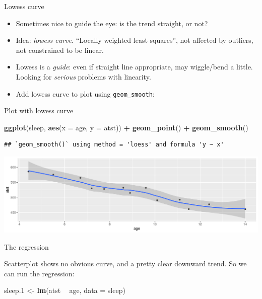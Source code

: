 \documentclass[
  ignorenonframetext,
]{beamer}
\newenvironment{Shaded}{\begin{snugshade}}{\end{snugshade}}
\newcommand{\DataTypeTok}[1]{\textcolor[rgb]{0.13,0.29,0.53}{#1}}
\newcommand{\FloatTok}[1]{\textcolor[rgb]{0.00,0.00,0.81}{#1}}
\newcommand{\KeywordTok}[1]{\textcolor[rgb]{0.13,0.29,0.53}{\textbf{#1}}}
\newcommand{\NormalTok}[1]{#1}
\newcommand{\OperatorTok}[1]{\textcolor[rgb]{0.81,0.36,0.00}{\textbf{#1}}}
\newcommand{\StringTok}[1]{\textcolor[rgb]{0.31,0.60,0.02}{#1}}
\begin{document}
\begin{frame}[fragile]{Lowess curve}
\protect\hypertarget{lowess-curve}{}

\begin{itemize}
\item
  Sometimes nice to guide the eye: is the trend straight, or not?
\item
  Idea: \emph{lowess curve}. ``Locally weighted least squares'', not
  affected by outliers, not constrained to be linear.
\item
  Lowess is a \emph{guide}: even if straight line appropriate, may
  wiggle/bend a little. Looking for \emph{serious} problems with
  linearity.
\item
  Add lowess curve to plot using \texttt{geom\_smooth}:
\end{itemize}

\end{frame}

\begin{frame}[fragile]{Plot with lowess curve}
\protect\hypertarget{plot-with-lowess-curve}{}

\begin{Shaded}
\begin{Highlighting}[]
\KeywordTok{ggplot}\NormalTok{(sleep, }\KeywordTok{aes}\NormalTok{(}\DataTypeTok{x =}\NormalTok{ age, }\DataTypeTok{y =}\NormalTok{ atst)) }\OperatorTok{+}\StringTok{ }\KeywordTok{geom_point}\NormalTok{() }\OperatorTok{+}
\StringTok{  }\KeywordTok{geom_smooth}\NormalTok{()}
\end{Highlighting}
\end{Shaded}

\begin{verbatim}
## `geom_smooth()` using method = 'loess' and formula 'y ~ x'
\end{verbatim}

\includegraphics{slides_d29_files/figure-beamer/icko-1.pdf}

\end{frame}

\begin{frame}[fragile]{The regression}
\protect\hypertarget{the-regression}{}

Scatterplot shows no obvious curve, and a pretty clear downward trend.
So we can run the regression:

\begin{Shaded}
\begin{Highlighting}[]
\NormalTok{sleep}\FloatTok{.1}\NormalTok{ <-}\StringTok{ }\KeywordTok{lm}\NormalTok{(atst }\OperatorTok{~}\StringTok{ }\NormalTok{age, }\DataTypeTok{data =}\NormalTok{ sleep)}
\end{Highlighting}
\end{Shaded}

\end{frame}
\end{document}
